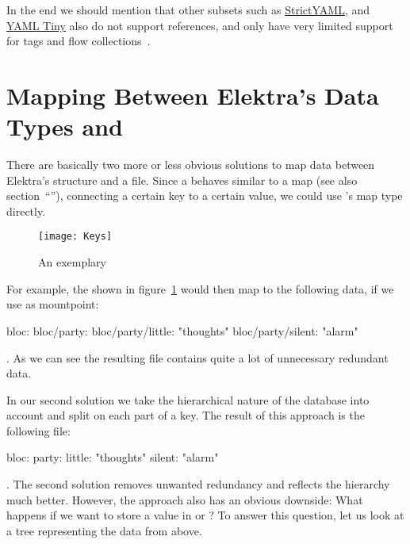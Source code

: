 In the end we should mention that other  subsets such as \href{https://github.com/crdoconnor/strictyaml}{StrictYAML}, and \href{https://metacpan.org/pod/YAML::Tiny}{YAML Tiny} also do not support references, and only have very limited support for tags and flow collections~\cite{connor2018strictyaml, kennedy2018yamltiny}.

\newpage
\section{Mapping Between Elektra’s Data Types and }
\label{sec:mapping_elektra_yaml}

\begin{sloppypar}
  There are basically two more or less obvious solutions to map data between Elektra’s  structure and a  file. Since a  behaves similar to a map (see also section~“”), connecting a certain key to a certain value, we could use ’s map type directly.
\end{sloppypar}

\begin{figure}
  \centering
    \texttt{[image: Keys]}
  \caption{An exemplary }
  \label{fig:keys}
\end{figure}

For example, the  shown in figure~\ref{fig:keys} would then map to the following  data, if we use  as mountpoint:

\begin{yamlcode}
  bloc:
  bloc/party:
  bloc/party/little: "thoughts"
  bloc/party/silent: "alarm"
\end{yamlcode}

. As we can see the resulting  file contains quite a lot of unnecessary redundant data.

In our second solution we take the hierarchical nature of the database into account and split on each part of a key. The result of this approach is the following  file:

\begin{yamlcode}
  bloc:
    party:
      little: "thoughts"
      silent: "alarm"
\end{yamlcode}

. The second solution removes unwanted redundancy and reflects the hierarchy much better. However, the approach also has an obvious downside: What happens if we want to store a value in  or ? To answer this question, let us look at a tree representing the  data from above.

